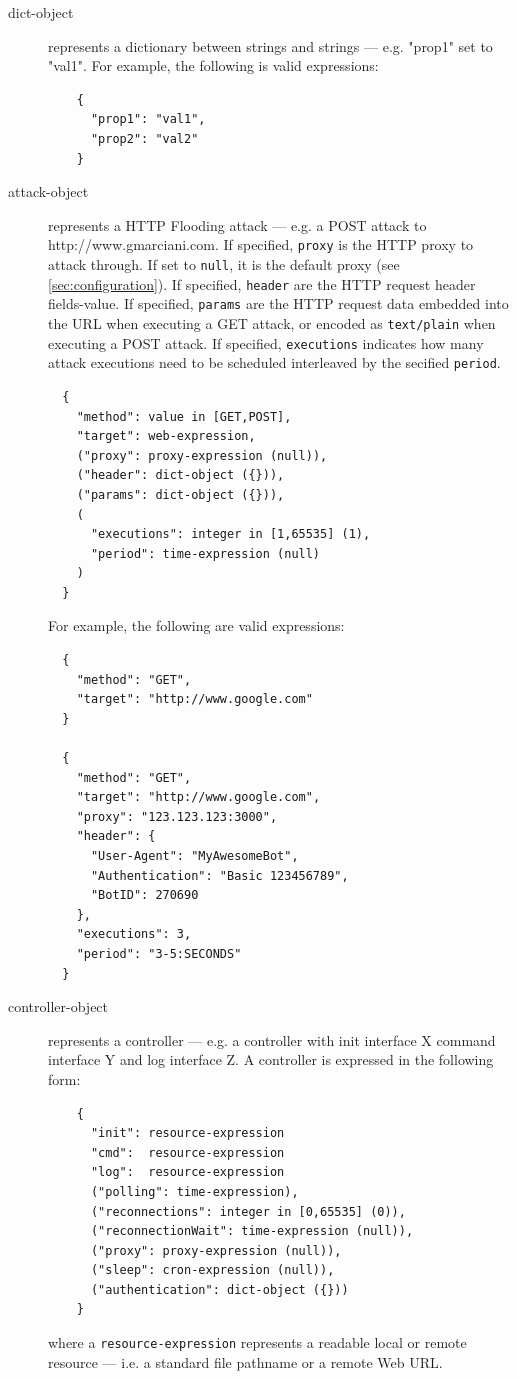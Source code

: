 \begin{description}
  \item[dict-object] represents a dictionary between strings and strings — e.g. "prop1" set to "val1".
  For example, the following is valid expressions:

  \begin{verbatim}
    {
      "prop1": "val1",
      "prop2": "val2"
    }
  \end{verbatim}

  \item[attack-object] represents a HTTP Flooding attack \cite{anderson2008security} — e.g. a POST attack to http://www.gmarciani.com.
  If specified, \texttt{proxy} is the HTTP proxy to attack through. If set to \texttt{null}, it is the default proxy (see \ref{sec:configuration}).
  If specified, \texttt{header} are the HTTP request header fields-value.
  If specified, \texttt{params} are the HTTP request data embedded into the URL when executing a GET attack, or encoded as \texttt{text/plain} when executing a POST attack.
  If specified, \texttt{executions} indicates how many attack executions need to be scheduled interleaved by the secified \texttt{period}.

  \begin{verbatim}
  {
    "method": value in [GET,POST],
    "target": web-expression,
    ("proxy": proxy-expression (null)),
    ("header": dict-object ({})),
    ("params": dict-object ({})),
    (
      "executions": integer in [1,65535] (1),
      "period": time-expression (null)
    )
  }
  \end{verbatim}

  For example, the following are valid expressions:

  \begin{verbatim}
  {
    "method": "GET",
    "target": "http://www.google.com"
  }

  {
    "method": "GET",
    "target": "http://www.google.com",
    "proxy": "123.123.123:3000",
    "header": {
      "User-Agent": "MyAwesomeBot",
      "Authentication": "Basic 123456789",
      "BotID": 270690
    },
    "executions": 3,
    "period": "3-5:SECONDS"
  }
  \end{verbatim}

  \item[controller-object] represents a controller — e.g. a controller with init interface X command interface Y and log interface Z. A controller is expressed in the following form:

  \begin{verbatim}
    {
      "init": resource-expression
      "cmd":  resource-expression
      "log":  resource-expression
      ("polling": time-expression),
      ("reconnections": integer in [0,65535] (0)),
      ("reconnectionWait": time-expression (null)),
      ("proxy": proxy-expression (null)),
      ("sleep": cron-expression (null)),
      ("authentication": dict-object ({}))
    }
  \end{verbatim}

  where a \texttt{resource-expression} represents a readable local or remote resource — i.e. a standard file pathname or a remote Web URL.

\end{description}

